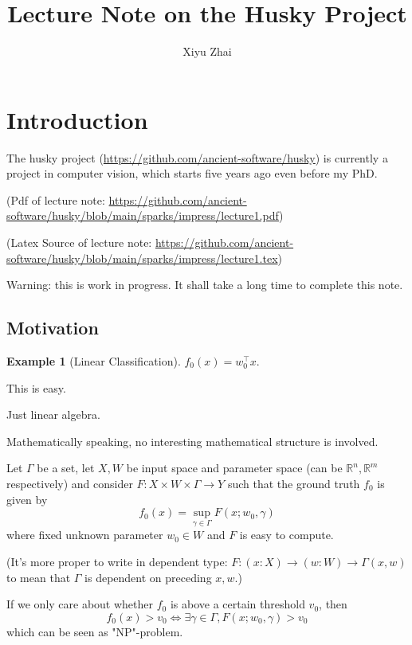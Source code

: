 \documentclass[11pt, oneside]{article}   	%
\title{Lecture Note on the Husky Project}
\author{Xiyu Zhai}
\date{}							%
\theoremstyle{definition}
\newtheorem*{eg}{Example}
\begin{document}
\maketitle
\tableofcontents
\section{Introduction}

The husky project (\url{https://github.com/ancient-software/husky}) is currently a project in computer vision, which starts five years ago even before my PhD.

(Pdf of lecture note: \url{https://github.com/ancient-software/husky/blob/main/sparks/impress/lecture1.pdf})

(Latex Source of lecture note: \url{https://github.com/ancient-software/husky/blob/main/sparks/impress/lecture1.tex})

Warning: this is work in progress. It shall take a long time to complete this note.

\subsection{Motivation}

\begin{eg}
	[Linear Classification]

	$f_0(x)=w_0^\top x$.

	This is easy.

	Just linear algebra.

	Mathematically speaking, no interesting mathematical structure is involved.
\end{eg}

Let $\Gamma$ be a set, let $X, W$ be input space and parameter space (can be $\mathbb{R}^n, \mathbb{R}^m$ respectively) and consider $F:X\times W\times\Gamma\to Y$ such that the ground truth $f_0$ is given by 
\begin{equation}
	f_0(x)= \sup_{\gamma\in \Gamma}F(x; w_0, \gamma)
\end{equation}
where fixed unknown parameter $w_0\in W$ and $F$ is easy to compute.

(It's more proper to write in dependent type: $F: (x: X)\to (w: W) \to \Gamma(x, w)$ to mean that $\Gamma$ is dependent on preceding $x,w$.)

If we only care about whether $f_0$ is above a certain threshold $v_0$, then
\begin{equation}
	f_0(x) > v_0\Leftrightarrow\exists \gamma\in \Gamma, F(x; w_0, \gamma) > v_0
\end{equation}
which can be seen as "NP"-problem.
\end{document}
